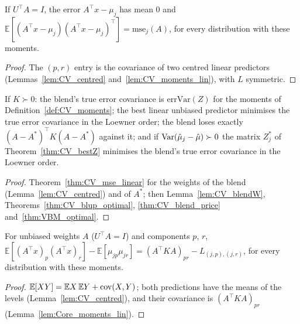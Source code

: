 \begin{theorem}\label{thm:CV_mse_linear}
  \leanok
  If $U^\top A = I$, the error $A^\top x - \mu_j$ has mean $0$ and
  $\mathbb E[(A^\top x - \mu_j)(A^\top x - \mu_j)^\top] = \mathrm{mse}_j(A)$, for every
  distribution with these moments.
\end{theorem}
\begin{proof}
  \leanok
  The $(p,r)$ entry is the covariance of two centred linear predictors
  (Lemmas~\ref{lem:CV_centred} and~\ref{lem:CV_moments_lin}), with $L$ symmetric.
\end{proof}

\begin{theorem}\label{thm:CV_mse_blend}
  \leanok
  If $K \succ 0$: the blend's true error covariance is $\mathrm{errVar}(Z)$ for the moments of
  Definition~\ref{def:CV_moments}; the best linear unbiased predictor minimises the true error
  covariance in the Loewner order; the blend loses exactly $(A - A^\ast)^\top K(A - A^\ast)$
  against it; and if $\operatorname{Var}(\hat\mu_j - \hat\mu) \succ 0$ the matrix $Z_j^\ast$ of
  Theorem~\ref{thm:CV_bestZ} minimises the blend's true error covariance in the Loewner order.
\end{theorem}
\begin{proof}
  \leanok
  Theorem~\ref{thm:CV_mse_linear} for the weights of the blend (Lemma~\ref{lem:CV_centred})
  and of $A^\ast$; then Lemma~\ref{lem:CV_blendW}, Theorems~\ref{thm:CV_blup_optimal},
  \ref{thm:CV_blend_price} and~\ref{thm:VBM_optimal}.
\end{proof}

\begin{theorem}\label{thm:CV_prod_bias}
  \leanok
  For unbiased weights $A$ ($U^\top A = I$) and components $p$, $r$,
  $\mathbb E[(A^\top x)_p(A^\top x)_r] - \mathbb E[\mu_{jp}\mu_{jr}]
    = (A^\top KA)_{pr} - L_{(j,p),(j,r)}$, for every distribution with these moments.
\end{theorem}
\begin{proof}
  \leanok
  $\mathbb E[XY] = \mathbb EX\,\mathbb EY + \operatorname{cov}(X, Y)$; both predictions have the means of the
  levels (Lemma~\ref{lem:CV_centred}), and their covariance is $(A^\top KA)_{pr}$
  (Lemma~\ref{lem:Core_moments_lin}).
\end{proof}


